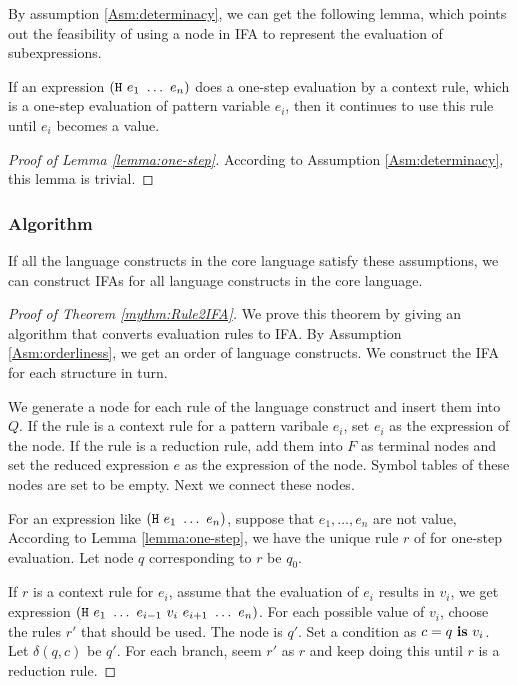 By assumption \ref{Asm:determinacy}, we can get the following lemma, which points out the feasibility of using a node in IFA to represent the evaluation of subexpressions.

\begin{lemma}
    \label{lemma:one-step}
    If an expression $(\mbox{\tt H}~e_1~\ldots~e_n)$ does a one-step evaluation by a context rule, which is a one-step evaluation of pattern variable $e_i$, then it continues to use this rule until $e_i$ becomes a value.
\end{lemma}

\begin{proof}[Proof of Lemma \ref{lemma:one-step}]
    According to Assumption \ref{Asm:determinacy}, this lemma is trivial.
\end{proof}

\subsubsection{Algorithm}

\begin{mythm}
    \label{mythm:Rule2IFA}
    If all the language constructs in the core language satisfy these assumptions, we can construct IFAs for all language constructs in the core language.
\end{mythm}

\begin{proof}[Proof of Theorem \ref{mythm:Rule2IFA}]

    We prove this theorem by giving an algorithm that converts evaluation rules to IFA. By Assumption \ref{Asm:orderliness}, we get an order of language constructs. We construct the IFA for each structure in turn.

    We generate a node for each rule of the language construct  and insert them into $Q$. If the rule is a context rule for a pattern varibale $e_i$, set $e_i$ as the expression of the node. If the rule is a reduction rule, add them into $F$ as terminal nodes and set the reduced expression $e$ as the expression of the node. Symbol tables of these nodes are set to be empty. Next we connect these nodes.

    For an expression like $(\mbox{\tt H}~e_1~\ldots~e_n)$, suppose that $e_1, \ldots, e_n$ are not value, According to Lemma \ref{lemma:one-step}, we have the unique rule $r$ of  for one-step evaluation. Let node $q$ corresponding to $r$ be $q_0$.

    If $r$ is a context rule for $e_i$, assume that the evaluation of $e_i$ results in $v_i$, we get expression $(\mbox{\tt H}~e_1~\ldots~e_{i-1}~v_i~e_{i+1}~\ldots~e_n)$. For each possible value of $v_i$, choose the rules $r'$ that should be used. The node is $q'$. Set a condition as $c=q~\mbox{\rm \bf is}~v_i$. Let $\delta(q, c)$ be $q'$. For each branch, seem $r'$ as $r$ and keep doing this until $r$ is a reduction rule.
\end{proof}

